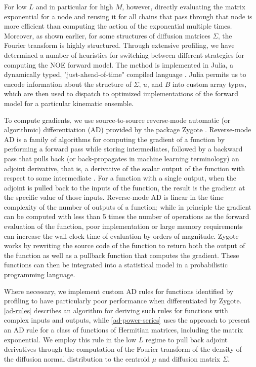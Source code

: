 \documentclass[../../main.tex]{subfiles}
\begin{document}
\begin{refsection}
	For low $L$ and in particular for high $M$, however, directly evaluating the matrix exponential for a node and reusing it for all chains that pass through that node is more efficient than computing the action of the exponential multiple times.
	Moreover, as shown earlier, for some structures of diffusion matrices $\Sigma$, the Fourier transform is highly structured.
	Through extensive profiling, we have determined a number of heuristics for switching between different strategies for computing the NOE forward model.
	The method is implemented in Julia, a dynamically typed, "just-ahead-of-time" compiled language \supercite{Julia-2017}.
	Julia permits us to encode information about the structure of $\Sigma$, $u$, and $B$ into custom array types, which are then used to dispatch to optimized implementations of the forward model for a particular kinematic ensemble.

	To compute gradients, we use source-to-source reverse-mode automatic (or algorithmic) differentiation (AD) provided by the package Zygote \supercite{innesDonUnrollAdjoint2019}.
	Reverse-mode AD is a family of algorithms for computing the gradient of a function by performing a forward pass while storing intermediates, followed by a backward pass that pulls back (or back-propagates in machine learning terminology) an adjoint derivative, that is, a derivative of the scalar output of the function with respect to some intermediate \supercite{griewankEvaluatingDerivativesPrinciples2008}.
	For a function with a single output, when the adjoint is pulled back to the inputs of the function, the result is the gradient at the specific value of those inputs.
	Reverse-mode AD is linear in the time complexity of the number of outputs of a function; while in principle the gradient can be computed with less than 5 times the number of operations as the forward evaluation of the function, poor implementation or large memory requirements can increase the wall-clock time of evaluation by orders of magnitude.
	Zygote works by rewriting the source code of the function to return both the output of the function as well as a pullback function that computes the gradient.
	These functions can then be integrated into a statistical model in a probabilistic programming language.

	Where necessary, we implement custom AD rules for functions identified by profiling to have particularly poor performance when differentiated by Zygote.
	\cref{ad-rules} describes an algorithm for deriving such rules for functions with complex inputs and outputs, while \cref{ad-power-series} uses the approach to present an AD rule for a class of functions of Hermitian matrices, including the matrix exponential.
	We employ this rule in the low $L$ regime to pull back adjoint derivatives through the computation of the Fourier transform of the density of the diffusion normal distribution to the centroid $\mu$ and diffusion matrix $\Sigma$.


\end{refsection}
\end{document}
